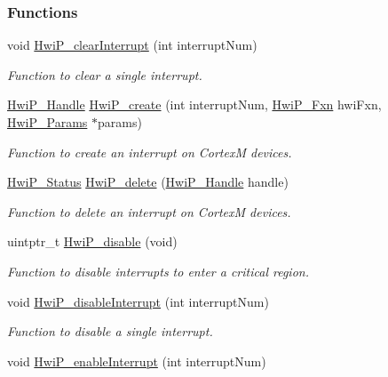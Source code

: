 \subsubsection*{Functions}
\begin{DoxyCompactItemize}
\item 
void \hyperlink{_hwi_p_8h_afe8d9c04a4f255f272ca690b25d59c7e}{Hwi\+P\+\_\+clear\+Interrupt} (int interrupt\+Num)
\begin{DoxyCompactList}\small\item\em Function to clear a single interrupt. \end{DoxyCompactList}\item 
\hyperlink{_hwi_p_8h_a7dd325ff62af296374efc6d317f5e368}{Hwi\+P\+\_\+\+Handle} \hyperlink{_hwi_p_8h_a3d80df47f0bdcbb6e562ee7b96a40af5}{Hwi\+P\+\_\+create} (int interrupt\+Num, \hyperlink{_hwi_p_8h_a53a36fe33e22847927ceddbb63fb50c7}{Hwi\+P\+\_\+\+Fxn} hwi\+Fxn, \hyperlink{struct_hwi_p___params}{Hwi\+P\+\_\+\+Params} $\ast$params)
\begin{DoxyCompactList}\small\item\em Function to create an interrupt on Cortex\+M devices. \end{DoxyCompactList}\item 
\hyperlink{_hwi_p_8h_a8f508a9a62c31a942ffc9438f53dd258}{Hwi\+P\+\_\+\+Status} \hyperlink{_hwi_p_8h_add08a6b4ccaca002ebb240777cc7f832}{Hwi\+P\+\_\+delete} (\hyperlink{_hwi_p_8h_a7dd325ff62af296374efc6d317f5e368}{Hwi\+P\+\_\+\+Handle} handle)
\begin{DoxyCompactList}\small\item\em Function to delete an interrupt on Cortex\+M devices. \end{DoxyCompactList}\item 
uintptr\+\_\+t \hyperlink{_hwi_p_8h_aac47ffab62f7d25d736b58e40be17425}{Hwi\+P\+\_\+disable} (void)
\begin{DoxyCompactList}\small\item\em Function to disable interrupts to enter a critical region. \end{DoxyCompactList}\item 
void \hyperlink{_hwi_p_8h_a2ab29f4a0e277d336338900c07151325}{Hwi\+P\+\_\+disable\+Interrupt} (int interrupt\+Num)
\begin{DoxyCompactList}\small\item\em Function to disable a single interrupt. \end{DoxyCompactList}\item 
void \hyperlink{_hwi_p_8h_a31f70cf8be574453b13dd9bfa4c8da26}{Hwi\+P\+\_\+enable\+Interrupt} (int interrupt\+Num)

\end{DoxyCompactItemize}
